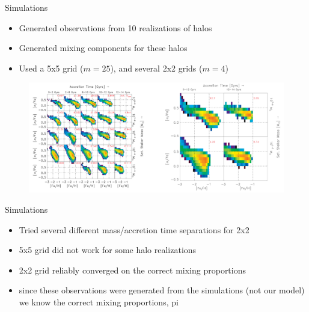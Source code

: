 \documentclass{beamer}
\begin{document}
\begin{frame}{Simulations}
	
	
	
	
	\begin{itemize}
		\item Generated observations from 10 realizations of halos
		\item Generated mixing components for these halos
		\item Used a 5x5 grid ($m=25$), and several 2x2 grids ($m=4$)
	\end{itemize}
	
	
	
	\begin{figure}
			\begin{center}
				\includegraphics[width=\textwidth]{ourdens.pdf}
			\end{center}
	\end{figure}
	
	
	
	
\end{frame}
\begin{frame}[shrink]{Simulations}
	
	\begin{itemize}
		\item Tried several different mass/accretion time separations for 2x2
		\item 5x5 grid did not work for some halo realizations
		\item 2x2 grid reliably converged on the correct mixing proportions
		\item since these observations were generated from the simulations (not our model) we know the correct mixing proportions, pi
	\end{itemize}
	
\end{frame}
\end{document}
